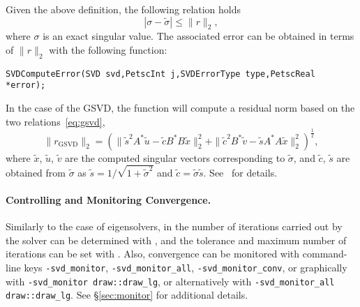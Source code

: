 Given the above definition, the following relation holds
\begin{equation}
|\sigma-\tilde{\sigma}|\leq \|r\|_2,
\end{equation}
where $\sigma$ is an exact singular value. The associated error can be obtained in terms of $\|r\|_2$ with the following function:
	\begin{Verbatim}[fontsize=\small]
	SVDComputeError(SVD svd,PetscInt j,SVDErrorType type,PetscReal *error);
	\end{Verbatim}

In the case of the GSVD, the function  will compute a residual norm based on the two relations~\eqref{eq:gsvd},
\begin{equation}
\|r_\mathrm{GSVD}\|_2=\left(\|\tilde{s}^2A^*\tilde{u}-\tilde{c}B^*B\tilde{x}\|_2^2+\|\tilde{c}^2B^*\tilde{v}-\tilde{s}A^*A\tilde{x}\|_2^2\right)^{\frac{1}{2}},
\end{equation}
where $\tilde{x}$, $\tilde{u}$, $\tilde{v}$ are the computed singular vectors corresponding to $\tilde{\sigma}$, and $\tilde{c}$, $\tilde{s}$ are obtained from $\tilde{\sigma}$ as $\tilde{s}=1/\sqrt{1+\tilde{\sigma}^2}$ and $\tilde{c}=\tilde{\sigma}\tilde{s}$. See~\citep{Alvarruiz:2022:TRL} for details.

\paragraph{Controlling and Monitoring Convergence.}

Similarly to the case of eigensolvers, in  the number of iterations carried out by the solver can be determined with , and the tolerance and maximum number of iterations can be set with . Also, convergence can be monitored with command-line keys \Verb!-svd_monitor!, \Verb!-svd_monitor_all!, \Verb!-svd_monitor_conv!, or graphically with \Verb!-svd_monitor draw::draw_lg!, or alternatively with \Verb!-svd_monitor_all draw::draw_lg!. See \S\ref{sec:monitor} for additional details.

